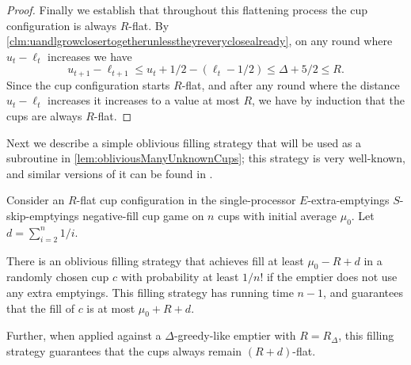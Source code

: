 \begin{proof}
  Finally we establish that throughout this flattening process
  the cup configuration is always $R$-flat. By
  \cref{clm:uandlgrowclosertogetherunlesstheyreveryclosealready},
  on any round where $u_t-\ell_t$ increases we have $$u_{t+1} -
  \ell_{t+1} \le u_t +1/2 - (\ell_t -1/2)  \le \Delta + 5/2 \le
  R.$$ Since the cup configuration starts $R$-flat, and after any
  round where the distance $u_t-\ell_t$ increases it increases to
  a value at most $R$, we have by induction that the cups are
  always $R$-flat.

\end{proof}


Next we describe a simple oblivious filling strategy that will be used as a
subroutine in \cref{lem:obliviousManyUnknownCups}; this strategy is very
well-known, and similar versions of it can be found in
\cite{ mbe19, mbe15, die91, wku20}.
\begin{proposition}
  \label{prop:obliviousTerribleProbability}
  Consider an $R$-flat cup configuration in the single-processor
  $E$-extra-emptyings $S$-skip-emptyings negative-fill cup
  game on $n$ cups with initial average $\mu_0$.
  Let $d = \sum_{i=2}^n 1/i$.

  There is an oblivious filling strategy that achieves fill at
  least $\mu_0 -R + d$ in a randomly chosen cup $c$ with probability at
  least $1/n!$ if the emptier does not use any extra emptyings.
  This filling strategy has running time $n-1$, and guarantees
  that the fill of $c$ is at most $\mu_0 + R + d$.

  Further, when applied against a $\Delta$-greedy-like emptier
  with $R = R_\Delta$, this filling strategy guarantees that
  the cups always remain $(R + d)$-flat.
\end{proposition}
